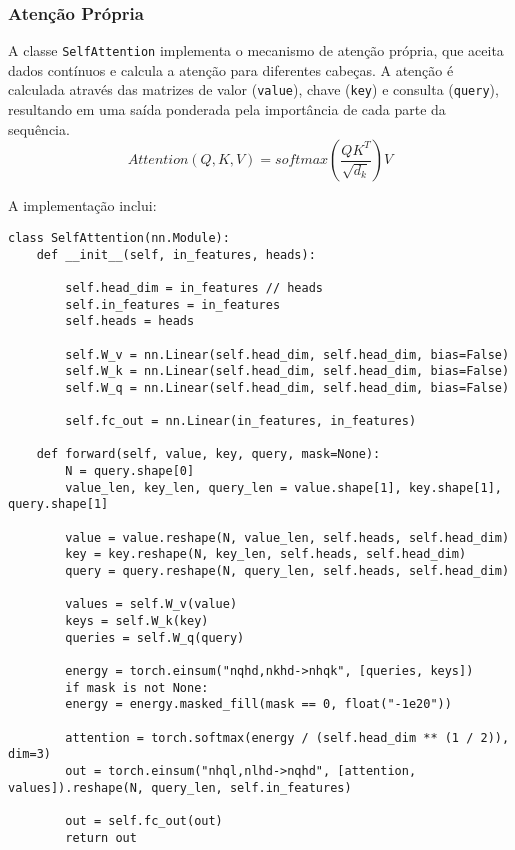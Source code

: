 \subsubsection{Atenção Própria}

A classe \texttt{SelfAttention} implementa o mecanismo de atenção própria, que aceita dados contínuos e calcula a atenção para diferentes cabeças. A atenção é calculada através das matrizes de valor (\texttt{value}), chave (\texttt{key}) e consulta (\texttt{query}), resultando em uma saída ponderada pela importância de cada parte da sequência. 
\begin{equation}
	\textit{Attention}(Q, K, V) = \textit{softmax}\left(\frac{QK^T}{\sqrt{d_k}}\right)V
\end{equation}

A implementação inclui:

\begin{verbatim}
class SelfAttention(nn.Module):
	def __init__(self, in_features, heads):
		
		self.head_dim = in_features // heads
		self.in_features = in_features
		self.heads = heads
		
		self.W_v = nn.Linear(self.head_dim, self.head_dim, bias=False)
		self.W_k = nn.Linear(self.head_dim, self.head_dim, bias=False)
		self.W_q = nn.Linear(self.head_dim, self.head_dim, bias=False)
		
		self.fc_out = nn.Linear(in_features, in_features)
		
	def forward(self, value, key, query, mask=None):
		N = query.shape[0]
		value_len, key_len, query_len = value.shape[1], key.shape[1], query.shape[1]
		
		value = value.reshape(N, value_len, self.heads, self.head_dim)
		key = key.reshape(N, key_len, self.heads, self.head_dim)
		query = query.reshape(N, query_len, self.heads, self.head_dim)
		
		values = self.W_v(value)
		keys = self.W_k(key)
		queries = self.W_q(query)
		
		energy = torch.einsum("nqhd,nkhd->nhqk", [queries, keys])
		if mask is not None:
		energy = energy.masked_fill(mask == 0, float("-1e20"))
		
		attention = torch.softmax(energy / (self.head_dim ** (1 / 2)), dim=3)
		out = torch.einsum("nhql,nlhd->nqhd", [attention, values]).reshape(N, query_len, self.in_features)
		
		out = self.fc_out(out)
		return out
\end{verbatim}


